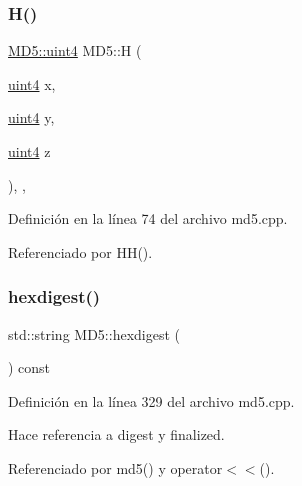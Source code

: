 \subsubsection{\texorpdfstring{H()}{H()}}
{\footnotesize\ttfamily \hyperlink{classMD5_a2e5b84a3d7db292f49873061214a0444}{M\+D5\+::uint4} M\+D5\+::H (\begin{DoxyParamCaption}\item[{\hyperlink{classMD5_a2e5b84a3d7db292f49873061214a0444}{uint4}}]{x,  }\item[{\hyperlink{classMD5_a2e5b84a3d7db292f49873061214a0444}{uint4}}]{y,  }\item[{\hyperlink{classMD5_a2e5b84a3d7db292f49873061214a0444}{uint4}}]{z }\end{DoxyParamCaption})\hspace{0.3cm}{\ttfamily [inline]}, {\ttfamily [static]}, {\ttfamily [private]}}



Definición en la línea 74 del archivo md5.\+cpp.



Referenciado por H\+H().

\hypertarget{classMD5_aaf466f683b4bd8b1b66544f48bf09608}{}\label{classMD5_aaf466f683b4bd8b1b66544f48bf09608} 
\subsubsection{\texorpdfstring{hexdigest()}{hexdigest()}}
{\footnotesize\ttfamily std\+::string M\+D5\+::hexdigest (\begin{DoxyParamCaption}{ }\end{DoxyParamCaption}) const}



Definición en la línea 329 del archivo md5.\+cpp.



Hace referencia a digest y finalized.



Referenciado por md5() y operator$<$$<$().

\hypertarget{classMD5_aaad039caf0b33abf1bf3f3589166543c}{}\label{classMD5_aaad039caf0b33abf1bf3f3589166543c} 
